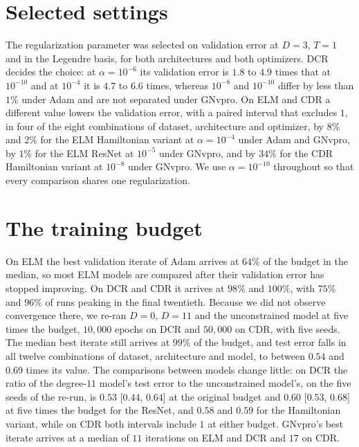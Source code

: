 \documentclass[pdflatex,sn-mathphys-num]{sn-jnl}%
\theoremstyle{thmstyleone}%
\theoremstyle{thmstyletwo}%
\theoremstyle{thmstylethree}%
\begin{document}
\begin{appendices}

\section{Selected settings}\label{app:selection}

The regularization parameter was selected on validation error at $D=3$, $T=1$ and in the Legendre
basis, for both architectures and both optimizers. DCR decides the choice: at $\alpha=10^{-6}$ its
validation error is $1.8$ to $4.9$ times that at $10^{-10}$ and at $10^{-4}$ it is $4.7$ to $6.6$
times, whereas $10^{-8}$ and $10^{-10}$ differ by less than $1\%$ under Adam and are not separated
under GNvpro. On ELM and CDR a different value lowers the validation error, with a paired interval that excludes $1$, in four of the eight
combinations of dataset, architecture and optimizer, by $8\%$ and $2\%$ for the ELM Hamiltonian
variant at $\alpha=10^{-4}$ under Adam and GNvpro, by $1\%$ for the ELM ResNet at $10^{-5}$ under
GNvpro, and by $34\%$ for the CDR Hamiltonian variant at $10^{-8}$ under GNvpro. We use $\alpha=10^{-10}$ throughout so that every comparison shares one
regularization.

\section{The training budget}\label{app:budget}

On ELM the best validation iterate of Adam arrives at $64\%$ of the budget in the median, so most
ELM models are compared after their validation error has stopped improving. On DCR and CDR it
arrives at $98\%$ and $100\%$, with $75\%$ and $96\%$ of runs peaking in the final twentieth.
Because we did not observe convergence there, we re-ran $D=0$, $D=11$ and the unconstrained model
at five times the budget, $10{,}000$ epochs on DCR and $50{,}000$ on CDR, with five seeds. The
median best iterate still arrives at $99\%$ of the budget, and test error falls in all twelve
combinations of dataset, architecture and model, to between $0.54$ and $0.69$ times its value. The
comparisons between models change little: on DCR the ratio of the degree-$11$ model's test error to
the unconstrained model's, on the five seeds of the re-run, is $0.53$ [$0.44$, $0.64$] at the original budget and $0.60$ [$0.53$,
$0.68$] at five times the budget for the ResNet, and $0.58$ and $0.59$ for the Hamiltonian variant,
while on CDR both intervals include $1$ at either budget. GNvpro's best iterate arrives at a median
of $11$ iterations on ELM and DCR and $17$ on CDR.


\end{appendices}
\end{document}
